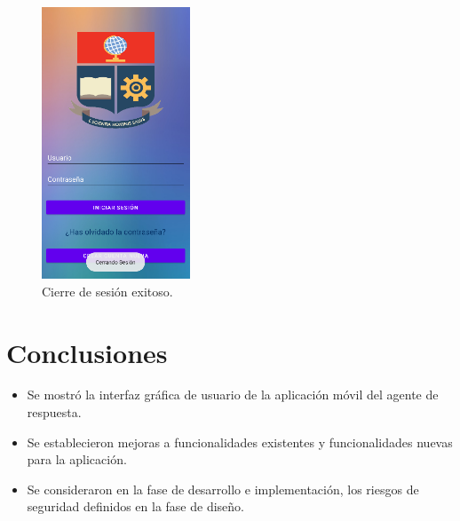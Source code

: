 \documentclass[a4paper,10pt, oneside, titlepage]{article}
\begin{document}
	\begin{figure}[!ht]
		\centering
		\includegraphics[width = 0.4\linewidth, height = 8.1cm]{50.png}
		\caption{Cierre de sesión exitoso.}
	\end{figure}
	
	\section{Conclusiones}
	\begin{itemize}
		\item Se mostró la interfaz gráfica de usuario de la aplicación móvil del agente de respuesta.
		\item Se establecieron mejoras a funcionalidades existentes y funcionalidades nuevas para la aplicación.
		\item Se consideraron en la fase de desarrollo e implementación, los riesgos de seguridad definidos en la fase de diseño.
	\end{itemize}	
\end{document}
